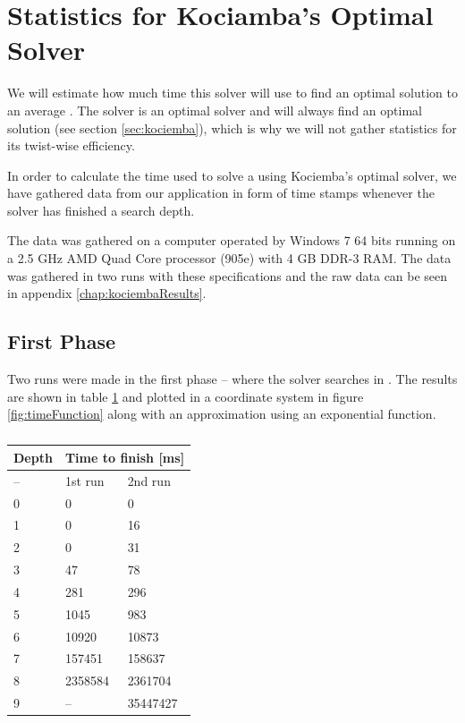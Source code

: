 \section{Statistics for Kociamba's Optimal Solver}
\label{app:kociembaTime}
We will estimate how much time this solver will use to find an optimal solution to an average \rubik{}.
The solver is an optimal solver and will always find an optimal solution (see section \ref{sec:kociemba}), which is why we will not gather statistics for its twist-wise efficiency.

In order to calculate the time used to solve a \rubik{} using Kociemba's optimal solver, we have gathered data from our application in form of time stamps whenever the solver has finished a search depth.

The data was gathered on a computer operated by Windows 7 64 bits running on a 2.5 GHz AMD Quad Core processor (905e) with 4 GB DDR-3 RAM.
The data was gathered in two runs with these specifications and the raw data can be seen in appendix \ref{chap:kociembaResults}.

\subsection{First Phase}
Two runs were made in the first phase -- where the solver searches in .
The results are shown in table \ref{tab:timeData} and plotted in a coordinate system in figure \ref{fig:timeFunction} along with an approximation using an exponential function.
\begin{table}[htb]
\centering
	\begin{tabular}{|l|l|l|}
	\hline
	Depth& \multicolumn{2}{|c|}{Time to finish [ms]}\\
	\hline
	--&1st run&2nd run\\
	\hline
	0&0&0\\
	\hline
	1&0&16\\
	\hline
	2&0&31\\
	\hline
	3&47&78\\
	\hline
	4&281&296\\
	\hline
	5&1045&983\\
	\hline
	6&10920&10873\\
	\hline
	7&157451&158637\\
	\hline
	8&2358584&2361704\\
	\hline
	9&--&35447427\\
	\hline
	\end{tabular}
\caption{}
	\label{tab:timeData}
\end{table}

